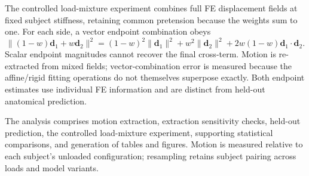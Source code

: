 The controlled load-mixture experiment combines full FE displacement fields at fixed subject stiffness, retaining common pretension because the weights sum to one. For each side, a vector endpoint combination obeys
\begin{equation}
\|(1-w)\mathbf d_1+w\mathbf d_2\|^2=(1-w)^2\|\mathbf d_1\|^2+w^2\|\mathbf d_2\|^2+2w(1-w)\mathbf d_1\cdot\mathbf d_2.
\end{equation}
Scalar endpoint magnitudes cannot recover the final cross-term. Motion is re-extracted from mixed fields; vector-combination error is measured because the affine/rigid fitting operations do not themselves superpose exactly. Both endpoint estimates use individual FE information and are distinct from held-out anatomical prediction.

The analysis comprises motion extraction, extraction sensitivity checks, held-out prediction, the controlled load-mixture experiment, supporting statistical comparisons, and generation of tables and figures. Motion is measured relative to each subject's unloaded configuration; resampling retains subject pairing across loads and model variants.
